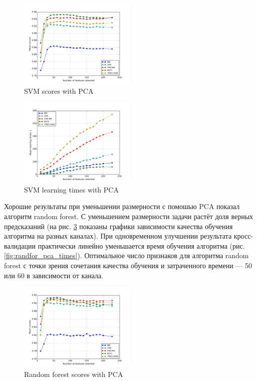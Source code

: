 \begin{figure}[h!]
    \centering
    \includegraphics[width=0.5\textwidth]{images/PCA-SVM.png}
    \caption{SVM scores with PCA}
    \label{fig:svm_pca_scores}
\end{figure} 
\begin{figure}[h!]
    \centering
    \includegraphics[width=0.5\textwidth]{images/PCA-SVMTime.png}
    \caption{SVM learning times with PCA}
    \label{fig:svm_pca_times}
\end{figure} 
\par
 Хорошие результаты при уменьшении размерности с помошью PCA показал алгоритм random forest. С уменьшением размерности задачи растёт доля верных предсказаний (на рис. \ref{fig:randfor_pca_scores} показаны графики 
 зависимости качества обучения алгоритма на разных каналах).
 При одновременном улучшении результата кросс-валидации практически линейно уменьшается время обучения алгоритма (рис. \ref{fig:randfor_pca_times}). Оптимальное число признаков для алгоритма random forest с точки зрения сочетания качества обучения и затраченного времени --- 50 или 60 в зависимости от канала.
 
\begin{figure}[h!]
    \centering
    \includegraphics[width=0.5\textwidth]{images/PCA-randfor.png}
    \caption{Random forest scores with PCA}
    \label{fig:randfor_pca_scores}
\end{figure} 
 
